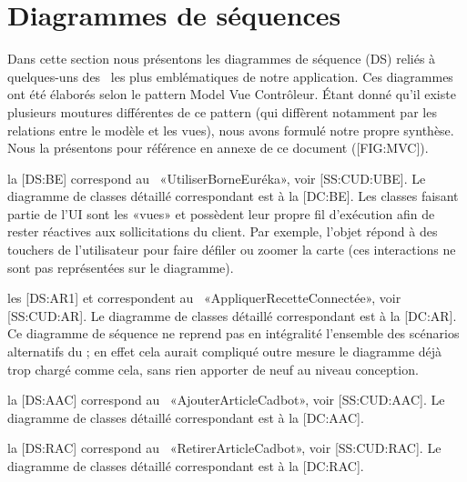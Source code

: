 \chapter{Diagrammes de séquences}

Dans cette section nous présentons les diagrammes de séquence (DS) reliés à quelques-uns des \cu\ les plus emblématiques de notre application.\crlf
Ces diagrammes ont été élaborés selon le pattern Model Vue Contrôleur. 
Étant donné qu'il existe plusieurs moutures différentes de ce pattern (qui diffèrent notamment par les relations entre le modèle et les vues), nous avons formulé notre propre synthèse. 
Nous la présentons pour référence en annexe de ce document ([FIG:MVC]).

\startitemize
\item la [DS:BE] correspond au \cu\ «UtiliserBorneEuréka», voir [SS:CUD:UBE].
Le diagramme de classes détaillé correspondant est à la [DC:BE].
Les classes faisant partie de l'UI sont les «vues» et possèdent leur propre fil d'exécution afin de rester réactives aux sollicitations du client.
Par exemple, l'objet  répond à des touchers de l'utilisateur pour faire défiler ou zoomer la carte (ces interactions ne sont pas représentées sur le diagramme).

\item les [DS:AR1] et \in[DS:AR2] correspondent au \cu\ «AppliquerRecetteConnectée», voir [SS:CUD:AR].
Le diagramme de classes détaillé correspondant est à la [DC:AR].
Ce diagramme de séquence ne reprend pas en intégralité l'ensemble des scénarios alternatifs du \cu; en effet cela aurait compliqué outre mesure le diagramme déjà trop chargé comme cela, sans rien apporter de neuf au niveau conception.

\item la [DS:AAC] correspond au \cu\ «AjouterArticleCadbot», voir [SS:CUD:AAC].
Le diagramme de classes détaillé correspondant est à la [DC:AAC].

\item la [DS:RAC] correspond au \cu\ «RetirerArticleCadbot», voir [SS:CUD:RAC].
Le diagramme de classes détaillé correspondant est à la [DC:RAC].


\stopitemize


{}

